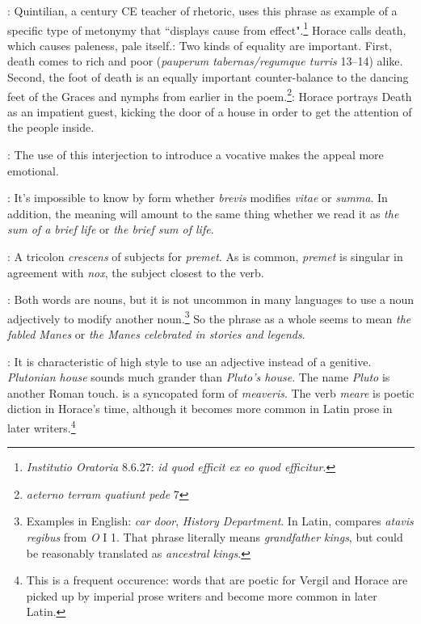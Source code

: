 
: Quintilian, a  century CE teacher of rhetoric, uses this phrase as example of a specific type of metonymy that ``displays cause from effect".\footnote{\textit{Institutio Oratoria} 8.6.27: \textit{id quod efficit ex eo quod efficitur}.}  Horace calls death, which causes paleness, pale itself.\indent{}: Two kinds of equality are important. First, death comes to rich and poor (\textit{pauperum tabernas/regumque turris} 13--14) alike.  Second, the foot of death is an equally important counter-balance to the dancing feet of the Graces and nymphs from earlier in the poem.\footnote{\textit{aeterno terram quatiunt pede} 7}\indent{}: Horace portrays Death as an impatient guest, kicking the door of a house in order to get the attention of the people inside.


: The use of this interjection to introduce a vocative makes the appeal more emotional.


: It's impossible to know by form whether \textit{brevis} modifies \textit{vitae} or \textit{summa}.  In addition, the meaning will amount to the same thing whether we read it as \textit{the sum of a brief life} or \textit{the brief sum of life}.


: A tricolon \textit{crescens} of subjects for \textit{premet}.  As is common, \textit{premet} is singular in agreement with \textit{nox}, the subject closest to the verb.


: Both words are nouns, but it is not uncommon in many languages to use a noun adjectively to modify another noun.\footnote{Examples in English: \textit{car door}, \textit{History Department}. In Latin, \citet[84]{mayer2012} compares \textit{atavis \lips regibus} from \textit{O} I 1.  That phrase literally means \textit{grandfather kings}, but could be reasonably translated as \textit{ancestral kings}.}  So the phrase as a whole seems to mean \textit{the fabled Manes} or \textit{the Manes celebrated in stories and legends}.


: It is characteristic of high style to use an adjective instead of a genitive.  \textit{Plutonian house} sounds much grander than \textit{Pluto's house}.  The name \textit{Pluto} is another Roman touch.\indent{} is a syncopated form of \textit{meaveris}.  The verb \textit{meare} is poetic diction in Horace's time, although it becomes more common in Latin prose in later writers.\footnote{This is a frequent occurence: words that are poetic for Vergil and Horace are picked up by imperial prose writers and become more common in later Latin.}

